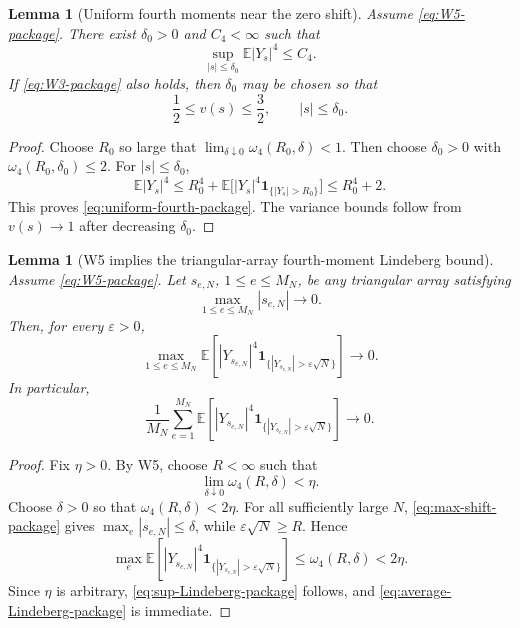 \documentclass[10pt,a4paper]{amsart}
\newtheorem{lemma}[theorem]{Lemma}
\newcommand{\E}{\mathbb E}
\newcommand{\one}{\mathbf 1}
\begin{document}
\begin{lemma}[Uniform fourth moments near the zero shift]
\label{lem:uniform-fourth-package}
Assume \eqref{eq:W5-package}.  There exist \(\delta_0>0\) and
\(C_4<\infty\) such that
\begin{equation}\label{eq:uniform-fourth-package}
 \sup_{|s|\le\delta_0}\E|Y_s|^4\le C_4.
\end{equation}
If \eqref{eq:W3-package} also holds, then \(\delta_0\) may be chosen so that
\begin{equation}\label{eq:uniform-variance-package}
 \frac12\le v(s)\le\frac32,
 \qquad |s|\le\delta_0.
\end{equation}
\end{lemma}

\begin{proof}
Choose \(R_0\) so large that
\(
 \lim_{\delta\downarrow0}\omega_4(R_0,\delta)<1.
\)
Then choose \(\delta_0>0\) with
\(\omega_4(R_0,\delta_0)\le2\).  For \(|s|\le\delta_0\),
\[
 \E|Y_s|^4
 \le R_0^4+
 \E\bigl[|Y_s|^4\one_{\{|Y_s|>R_0\}}\bigr]
 \le R_0^4+2.
\]
This proves \eqref{eq:uniform-fourth-package}.  The variance bounds follow
from \(v(s)\to1\) after decreasing \(\delta_0\).
\end{proof}

\begin{lemma}[W5 implies the triangular-array fourth-moment Lindeberg bound]
\label{lem:exact-W5-Lindeberg-package}
Assume \eqref{eq:W5-package}.  Let \(s_{e,N}\), \(1\le e\le M_N\), be any
triangular array satisfying
\begin{equation}\label{eq:max-shift-package}
 \max_{1\le e\le M_N}|s_{e,N}|\longrightarrow0.
\end{equation}
Then, for every \(\varepsilon>0\),
\begin{equation}\label{eq:sup-Lindeberg-package}
 \max_{1\le e\le M_N}
 \E\left[
 |Y_{s_{e,N}}|^4
 \one_{\{|Y_{s_{e,N}}|>\varepsilon\sqrt N\}}
 \right]
 \longrightarrow0.
\end{equation}
In particular,
\begin{equation}\label{eq:average-Lindeberg-package}
 \frac1{M_N}\sum_{e=1}^{M_N}
 \E\left[
 |Y_{s_{e,N}}|^4
 \one_{\{|Y_{s_{e,N}}|>\varepsilon\sqrt N\}}
 \right]
 \longrightarrow0.
\end{equation}
\end{lemma}

\begin{proof}
Fix \(\eta>0\).  By W5, choose \(R<\infty\) such that
\[
 \lim_{\delta\downarrow0}\omega_4(R,\delta)<\eta.
\]
Choose \(\delta>0\) so that \(\omega_4(R,\delta)<2\eta\).  For all
sufficiently large \(N\), \eqref{eq:max-shift-package} gives
\(\max_e|s_{e,N}|\le\delta\), while
\(\varepsilon\sqrt N\ge R\).  Hence
\[
 \max_e\E\left[
 |Y_{s_{e,N}}|^4
 \one_{\{|Y_{s_{e,N}}|>\varepsilon\sqrt N\}}
 \right]
 \le\omega_4(R,\delta)<2\eta.
\]
Since \(\eta\) is arbitrary, \eqref{eq:sup-Lindeberg-package} follows, and
\eqref{eq:average-Lindeberg-package} is immediate.
\end{proof}
\end{document}
